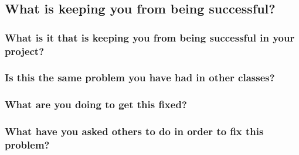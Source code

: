 \documentclass[letterpaper]{article}            %
\begin{document}
\subsection{What is keeping you from being successful?}

\subsubsection{What is it that is keeping you from being successful in your project?}



\subsubsection{Is this the same problem you have had in other classes?}



\subsubsection{What are you doing to get this fixed?}



\subsubsection{What have you asked others to do in order to fix this problem?}
\end{document}
